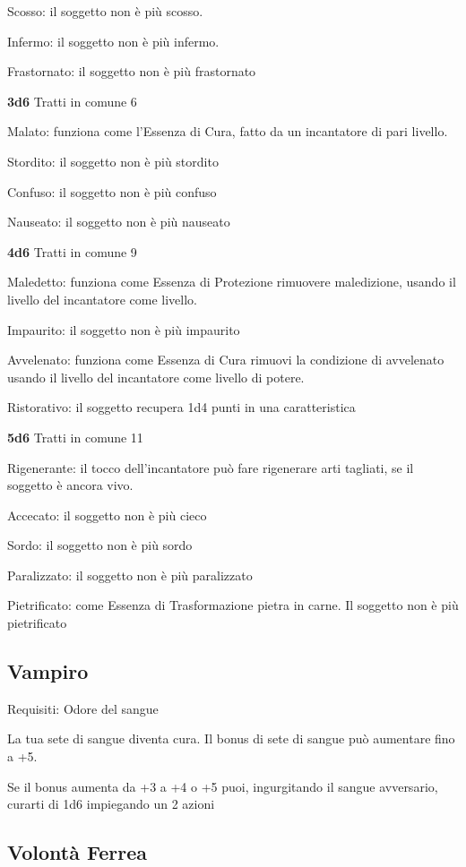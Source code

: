 \documentclass[a4paper,11pt,twoside,openany]{book}
\begin{document}
Scosso: il soggetto non è più scosso.

Infermo: il soggetto non è più infermo.

Frastornato: il soggetto non è più frastornato

\textbf{3d6} Tratti in comune 6

Malato: funziona come l'Essenza di Cura, fatto da un incantatore di pari livello.

Stordito: il soggetto non è più stordito

Confuso: il soggetto non è più confuso

Nauseato: il soggetto non è più nauseato

\textbf{4d6} Tratti in comune 9

Maledetto: funziona come Essenza di Protezione rimuovere maledizione, usando il livello del incantatore come livello.

Impaurito: il soggetto non è più impaurito

Avvelenato: funziona come Essenza di Cura rimuovi la condizione di avvelenato usando il livello del incantatore come livello di potere.

Ristorativo: il soggetto recupera 1d4 punti in una caratteristica

\textbf{5d6} Tratti in comune 11

Rigenerante: il tocco dell'incantatore può fare rigenerare arti tagliati, se il soggetto è ancora vivo.

Accecato: il soggetto non è più cieco

Sordo: il soggetto non è più sordo

Paralizzato: il soggetto non è più paralizzato

Pietrificato: come Essenza di Trasformazione pietra in carne. Il soggetto non è più pietrificato

\subsection{Vampiro}

Requisiti: Odore del sangue

La tua sete di sangue diventa cura. Il bonus di sete di sangue può aumentare fino a +5.

Se il bonus aumenta da +3 a +4 o +5 puoi, ingurgitando il sangue avversario, curarti di 1d6 impiegando un 2 azioni

\subsection{Volontà Ferrea}
\end{document}
